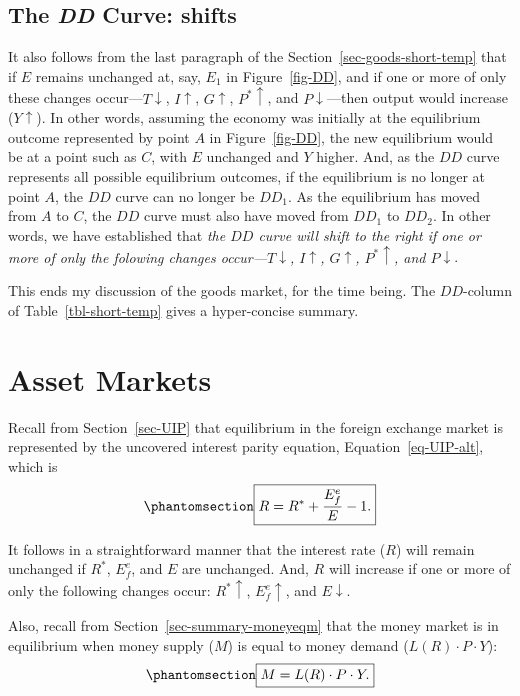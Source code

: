 \documentclass[
  letterpaper,
]{book}
\theoremstyle{plain}
\theoremstyle{remark}
\begin{document}
\subsection{\texorpdfstring{The \emph{DD} Curve:
shifts}{The DD Curve: shifts}}\label{sec-DD-shifts}

It also follows from the last paragraph of the
Section~\ref{sec-goods-short-temp} that if \(E\) remains unchanged at,
say, \(E_1\) in Figure~\ref{fig-DD}, and if one or more of only these
changes occur---\(T\downarrow\), \(I\uparrow\), \(G\uparrow\),
\(P^*\uparrow\), and \(P\downarrow\)---then output would increase
(\(Y\uparrow\)). In other words, assuming the economy was initially at
the equilibrium outcome represented by point \(A\) in
Figure~\ref{fig-DD}, the new equilibrium would be at a point such as
\(C\), with \(E\) unchanged and \(Y\) higher. And, as the \(DD\) curve
represents all possible equilibrium outcomes, if the equilibrium is no
longer at point \(A\), the \(DD\) curve can no longer be \(DD_1\). As
the equilibrium has moved from \(A\) to \(C\), the \(DD\) curve must
also have moved from \(DD_1\) to \(DD_2\). In other words, we have
established that \emph{the \(DD\) curve will shift to the right if one
or more of only the folowing changes occur---\(T\downarrow\),
\(I\uparrow\), \(G\uparrow\), \(P^*\uparrow\), and \(P\downarrow\)}.

This ends my discussion of the goods market, for the time being. The
\(DD\)-column of Table~\ref{tbl-short-temp} gives a hyper-concise
summary.

\section{Asset Markets}\label{sec-assets-short-temp}

Recall from Section~\ref{sec-UIP} that equilibrium in the foreign
exchange market is represented by the uncovered interest parity
equation, Equation~\ref{eq-UIP-alt}, which is
\begin{equation}\phantomsection\label{eq-UIP-short-temp}{
\fbox{$\displaystyle R=R^*+\frac{E^e_f}{E}-1.$}
}\end{equation}

It follows in a straightforward manner that the interest rate (\(R\))
will remain unchanged if \(R^*\), \(E_f^e\), and \(E\) are unchanged.
And, \(R\) will increase if one or more of only the following changes
occur: \(R^*\uparrow\), \(E_f^e\uparrow\), and \(E\downarrow\).

Also, recall from Section~\ref{sec-summary-moneyeqm} that the money
market is in equilibrium when money supply (\(M\)) is equal to money
demand (\(L(R)\cdot P\cdot Y\)):
\begin{equation}\phantomsection\label{eq-LM-short-temp}{
\fbox{$M=L(R)\cdot P\cdot Y.$}
}\end{equation}
\end{document}
